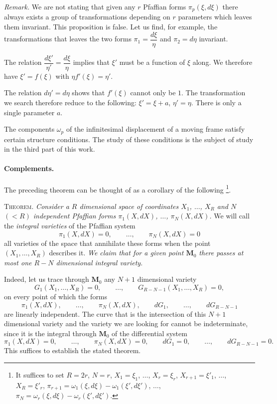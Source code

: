 \emph{Remark.} We are not stating that given any $r$ Pfaffian forms $\pi_{p}(\xi,d\xi)$ there always exists a group of transformations depending on $r$ parameters which leaves them invariant. This proposition is false. Let us find, for example, the transformations that leaves the two forms $\pi_{1}=\dfrac{d\xi}{\eta}$ and $\pi_{2}=d\eta$ invariant.

The relation $\dfrac{d\xi'}{\eta'}=\dfrac{d\xi}{\eta}$ implies that $\xi'$ must be a function of $\xi$ along. We therefore have $\xi'=f(\xi)$ with $\eta f'(\xi)=\eta'$.

The relation $d\eta'=d\eta$ shows that $f'(\xi)$ cannot only be $1$. The transformation we search therefore reduce to the following: $\xi'=\xi+a$, $\eta'=\eta$. There is only a single parameter $a$.

The components $\omega_{p}$ of the infinitesimal displacement of a moving frame satisfy certain structure conditions. The study of these conditions is the subject of study in the third part of this work.

\paragraph{Complements.}
\label{sec:84}
The preceding theorem can be thought of as a corollary of the following \footnote{It suffices to set $R=2r$, $N=r$, $X_{1}=\xi_{1}$, $\dots$, $X_{r}=\xi_{r}$, $X_{r+1}=\xi'_{1}$, $\dots$, $X_{R}=\xi'_{r}$, $\pi_{r+1}=\omega_{1}(\xi,d\xi)-\omega_{1}(\xi',d\xi')$, $\dots$, $\pi_{N}=\omega_{r}(\xi,d\xi)-\omega_{r}(\xi',d\xi')$.}.

\somespace

\textsc{Theorem.} \emph{Consider a $R$ dimensional space of coordinates $X_{1}$, $\dots$, $X_{R}$ and $N$ $(<R)$ independent Pfaffian forms $\pi_{1}(X,dX)$, $\dots$, $\pi_{N}(X,dX)$.} We will call the \emph{integral varieties} of the Pfaffian system
\[
\pi_{1}(X,dX)=0,\qquad\dots,\qquad \pi_{N}(X,dX)=0
\]
all varieties of the space that annihilate these forms when the point $(X_{1},\dots,X_{R})$ describes it. \emph{We claim that for a given point $\mathbf{M}_{0}$ there passes at most one $R-N$ dimensional integral variety.}

\somespace

Indeed, let us trace through $\mathbf{M}_{0}$ any $N+1$ dimensional variety
\[
G_{1}(X_{1},\dots,X_{R})=0,\qquad\dots,\qquad G_{R-N-1}(X_{1},\dots,X_{R})=0,
\]
on every point of which the forms
\[
\pi_{1}(X,dX),\qquad\dots,\qquad\pi_{N}(X,dX),\qquad dG_{1},\qquad\dots,\qquad dG_{R-N-1}
\]
are linearly independent. The curve that is the intersection of this $N+1$ dimensional variety and the variety we are looking for cannot be indeterminate, since it is the integral through $\mathbf{M}_{0}$ of the differential system
\[
\pi_{1}(X,dX)=0,\qquad\dots,\qquad\pi_{N}(X,dX)=0,\qquad dG_{1}=0,\qquad\dots,\qquad dG_{R-N-1}=0.
\]
This suffices to establish the stated theorem.

